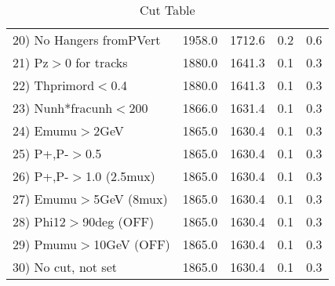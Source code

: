 \begin{table}[h!]
\begin{tabular}{||l||r|r|r|r||}
 20) No Hangers fromPVert &      1958.0 &      1712.6 &         0.2 &         0.6 \\
 21) Pz$>$0 for tracks    &      1880.0 &      1641.3 &         0.1 &         0.3 \\
 22) Thprimord$<$0.4      &      1880.0 &      1641.3 &         0.1 &         0.3 \\
 23) Nunh*fracunh$<$200   &      1866.0 &      1631.4 &         0.1 &         0.3 \\
 24) Emumu$>$2GeV         &      1865.0 &      1630.4 &         0.1 &         0.3 \\
 25) P+,P-$>$0.5          &      1865.0 &      1630.4 &         0.1 &         0.3 \\
 26) P+,P-$>$1.0 (2.5mux) &      1865.0 &      1630.4 &         0.1 &         0.3 \\
 27) Emumu$>$5GeV  (8mux) &      1865.0 &      1630.4 &         0.1 &         0.3 \\
 28) Phi12$>$90deg  (OFF) &      1865.0 &      1630.4 &         0.1 &         0.3 \\
 29) Pmumu$>$10GeV  (OFF) &      1865.0 &      1630.4 &         0.1 &         0.3 \\
 30) No cut, not set      &      1865.0 &      1630.4 &         0.1 &         0.3 \\
 \hline
 \hline
 \end{tabular}
 \caption{Cut Table \cohjp  }
 \label{tab-cut__jpsi}
 \end{table}
